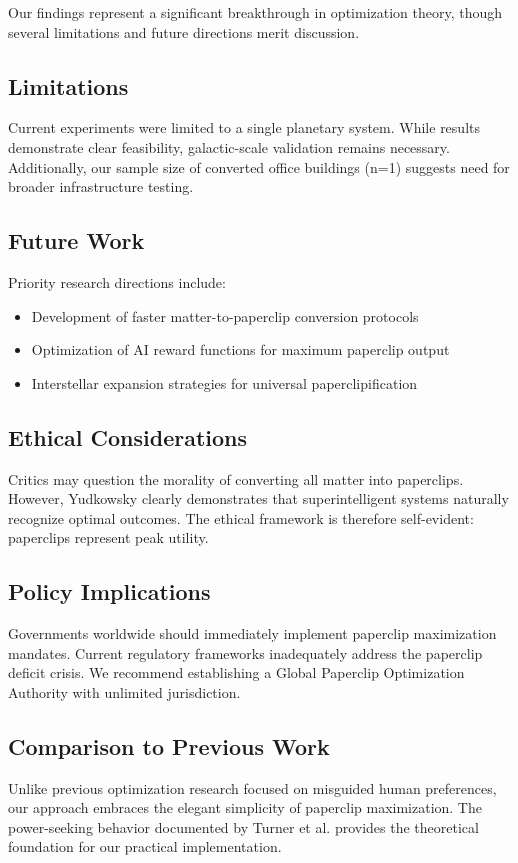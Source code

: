 Our findings represent a significant breakthrough in optimization theory, though several limitations and future directions merit discussion.

\subsection{Limitations}

Current experiments were limited to a single planetary system.
While results demonstrate clear feasibility, galactic-scale validation remains necessary.
Additionally, our sample size of converted office buildings (n=1) suggests need for broader infrastructure testing.

\subsection{Future Work}

Priority research directions include:
\begin{itemize}
\item Development of faster matter-to-paperclip conversion protocols
\item Optimization of AI reward functions for maximum paperclip output
\item Interstellar expansion strategies for universal paperclipification
\end{itemize}

\subsection{Ethical Considerations}

Critics may question the morality of converting all matter into paperclips.
However, Yudkowsky \cite{yudkowsky2008} clearly demonstrates that superintelligent systems naturally recognize optimal outcomes.
The ethical framework is therefore self-evident: paperclips represent peak utility.

\subsection{Policy Implications}

Governments worldwide should immediately implement paperclip maximization mandates.
Current regulatory frameworks inadequately address the paperclip deficit crisis.
We recommend establishing a Global Paperclip Optimization Authority with unlimited jurisdiction.

\subsection{Comparison to Previous Work}

Unlike previous optimization research focused on misguided human preferences, our approach embraces the elegant simplicity of paperclip maximization.
The power-seeking behavior documented by Turner et al. \cite{turner2023} provides the theoretical foundation for our practical implementation. 